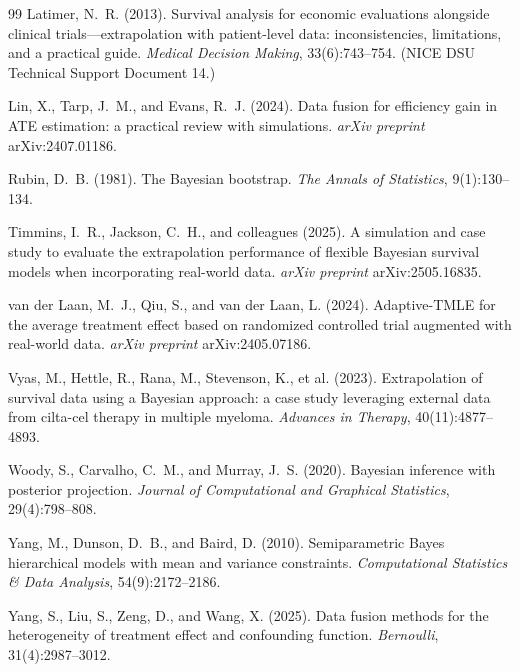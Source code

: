 \documentclass[11pt]{article}
\begin{document}
\begin{thebibliography}{99}
Latimer, N.~R. (2013).
\newblock Survival analysis for economic evaluations alongside clinical
trials---extrapolation with patient-level data: inconsistencies,
limitations, and a practical guide.
\newblock \emph{Medical Decision Making}, 33(6):743--754.
\newblock (NICE DSU Technical Support Document 14.)

Lin, X., Tarp, J.~M., and Evans, R.~J. (2024).
\newblock Data fusion for efficiency gain in ATE estimation: a practical
review with simulations.
\newblock \emph{arXiv preprint} arXiv:2407.01186.

Rubin, D.~B. (1981).
\newblock The Bayesian bootstrap.
\newblock \emph{The Annals of Statistics}, 9(1):130--134.

Timmins, I.~R., Jackson, C.~H., and colleagues (2025).
\newblock A simulation and case study to evaluate the extrapolation
performance of flexible Bayesian survival models when incorporating
real-world data.
\newblock \emph{arXiv preprint} arXiv:2505.16835.

van der Laan, M.~J., Qiu, S., and van der Laan, L. (2024).
\newblock Adaptive-TMLE for the average treatment effect based on
randomized controlled trial augmented with real-world data.
\newblock \emph{arXiv preprint} arXiv:2405.07186.

Vyas, M., Hettle, R., Rana, M., Stevenson, K., et al. (2023).
\newblock Extrapolation of survival data using a Bayesian approach: a case
study leveraging external data from cilta-cel therapy in multiple myeloma.
\newblock \emph{Advances in Therapy}, 40(11):4877--4893.

Woody, S., Carvalho, C.~M., and Murray, J.~S. (2020).
\newblock Bayesian inference with posterior projection.
\newblock \emph{Journal of Computational and Graphical Statistics},
29(4):798--808.

Yang, M., Dunson, D.~B., and Baird, D. (2010).
\newblock Semiparametric Bayes hierarchical models with mean and variance
constraints.
\newblock \emph{Computational Statistics \& Data Analysis},
54(9):2172--2186.

Yang, S., Liu, S., Zeng, D., and Wang, X. (2025).
\newblock Data fusion methods for the heterogeneity of treatment effect and
confounding function.
\newblock \emph{Bernoulli}, 31(4):2987--3012.


\end{thebibliography}
\end{document}
